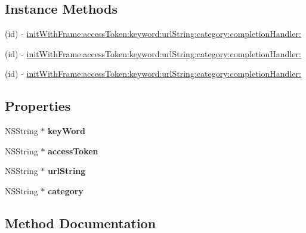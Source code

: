 \subsection*{Instance Methods}
\begin{DoxyCompactItemize}
\item 
(id) -\/ \mbox{\hyperlink{interface_w_b_s_d_k_comment_button_a16e90667bae39690e6c7388926a33d39}{init\+With\+Frame\+:access\+Token\+:keyword\+:url\+String\+:category\+:completion\+Handler\+:}}
\item 
(id) -\/ \mbox{\hyperlink{interface_w_b_s_d_k_comment_button_a16e90667bae39690e6c7388926a33d39}{init\+With\+Frame\+:access\+Token\+:keyword\+:url\+String\+:category\+:completion\+Handler\+:}}
\item 
(id) -\/ \mbox{\hyperlink{interface_w_b_s_d_k_comment_button_a16e90667bae39690e6c7388926a33d39}{init\+With\+Frame\+:access\+Token\+:keyword\+:url\+String\+:category\+:completion\+Handler\+:}}
\end{DoxyCompactItemize}
\subsection*{Properties}
\begin{DoxyCompactItemize}
\item 
\mbox{\label{interface_w_b_s_d_k_comment_button_ae659665706961a0f634a43943d5b9ddc}} 
N\+S\+String $\ast$ {\bfseries key\+Word}
\item 
\mbox{\label{interface_w_b_s_d_k_comment_button_ac3b52d99b9f9bce82f0c2571cdfae674}} 
N\+S\+String $\ast$ {\bfseries access\+Token}
\item 
\mbox{\label{interface_w_b_s_d_k_comment_button_ad7e72b66b835a921ebda05d4c362dd70}} 
N\+S\+String $\ast$ {\bfseries url\+String}
\item 
\mbox{\label{interface_w_b_s_d_k_comment_button_a83488e037a4851e60e3c3df1ab1ccad6}} 
N\+S\+String $\ast$ {\bfseries category}
\end{DoxyCompactItemize}


\subsection{Method Documentation}
\mbox{\label{interface_w_b_s_d_k_comment_button_a16e90667bae39690e6c7388926a33d39}} 
